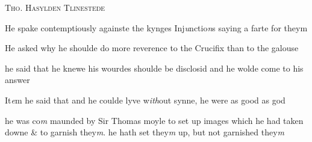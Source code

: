 \documentclass[12pt, a4paper]{book}
\begin{document}
 

               
               	
				\begin{center}  {\scshape Tho. Hasylden Tlinestede}  \end{center}
			
               	
               		
				\marginpar[\vspace{0.5cm}{\textcolor{Gray}{Injunctions n}}]{}
			 
               		
		\ifthenelse{\isodd{\thepage}}
		{\reversemarginpar}
		{\normalmarginpar}
		He spake contemptiously againste the kynges Inj\textit{u}nctio\textit{n}s
  saying a farte for theym
               	
               	
               		
				\marginpar[\vspace{0.5cm}{\textcolor{Gray}{offensive}}]{}
			
               		
		\ifthenelse{\isodd{\thepage}}
		{\reversemarginpar}
		{\normalmarginpar}
		He asked why he shoulde do more reverence to the
               		Crucifix than to the galouse
               		
		\ifthenelse{\isodd{\thepage}}
		{\reversemarginpar}
		{\normalmarginpar}
		 he said that he knewe his wourdes shoulde be disclosid
               			and he wolde come to his answer
               		
		\ifthenelse{\isodd{\thepage}}
		{\reversemarginpar}
		{\normalmarginpar}
		It\textit{e}m he said that and he coulde lyve w\textit{ith}out synne, he were
               			as good as god
               	
		
			
		
 
 
 	
				\marginpar[\vspace{0.5cm}{\textcolor{Gray}{Images}}]{}
			
 	
		\ifthenelse{\isodd{\thepage}}
		{\reversemarginpar}
		{\normalmarginpar}
		he was co\textit{m}
			maunded by Sir Thomas moyle to set up images which he had taken downe \& to garnish they\textit{m}. he hath set they\textit{m }up, but not garnished they\textit{m}
			
 

               
                  
\end{document}
